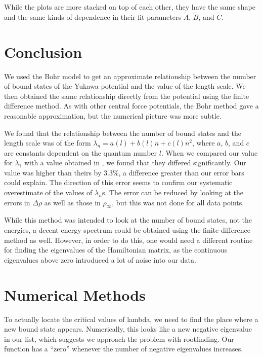 \documentclass[12pt,twoside]{reedthesis}
\begin{document}
While the plots are more stacked on top of each other, they have the same shape and the same kinds of dependence in their fit parameters $\tilde{A}$, $\tilde{B}$, and $\tilde{C}$.


%
%
\chapter*{Conclusion}
	\setcounter{chapter}{4}
	\setcounter{section}{0}

We used the Bohr model to get an approximate relationship between the number of bound states of the Yukawa potential and the value of the length scale. We then obtained the same relationship directly from the potential using the finite difference method. As with other central force potentials, the Bohr method gave a reasonable approximation, but the numerical picture was more subtle. 

We found that the relationship between the number of bound states and the length scale was of the form $\lambda_n = a(l) + b(l)n + c(l)n^2$, where $a$, $b$, and $c$ are constants dependent on the quantum number $l$. When we compared our value for $\lambda_1$ with a value obtained in \cite{PhysRevA.50.228}, we found that they differed significantly. Our value was higher than theirs by 3.3\%, a difference greater than our error bars could explain. The direction of this error seems to confirm our systematic overestimate of the values of $\lambda_n$s. The error can be reduced by looking at the errors in $\Delta \rho$ as well as those in $\rho_{\infty}$, but this was not done for all data points.

While this method was intended to look at the number of bound states, not the energies, a decent energy spectrum could be obtained using the finite difference method as well. However, in order to do this, one would need a different routine for finding the eigenvalues of the Hamiltonian matrix, as the continuous eigenvalues above zero introduced a lot of noise into our data. 
%
\appendix
\chapter{Numerical Methods}
To actually locate the critical values of lambda, we need to find the place where a new bound state appears. Numerically, this looks like a new negative eigenvalue in our list, which suggests we approach the problem with rootfinding. Our function has a ``zero'' whenever the number of negative eigenvalues increases.
\end{document}
